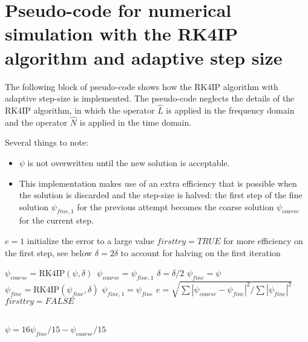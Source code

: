 \section{Pseudo-code for numerical simulation with the RK4IP algorithm and adaptive step size}


The following block of pseudo-code shows how the RK4IP algorithm with adaptive step-size is implemented. The pseudo-code neglects the details of the RK4IP algorithm, in which the operator $\hat{L}$ is applied in the frequency domain and the operator $\hat{N}$ is applied in the time domain. 

Several things to note:
\begin{itemize}
	\item $\psi$ is not overwritten until the new solution is acceptable. 
	\item This implementation makes use of an extra efficiency that is possible when the solution is discarded and the step-size is halved: the first step of the fine solution $\psi_{fine,1}$ for the previous attempt becomes the coarse solution $\psi_{coarse}$ for the current step.
\end{itemize}


	\begin{algorithmic}
		

		
		
		
		
		\State $e=1$ initialize the error to a large value
		\State $firsttry=TRUE$ for more efficiency on the first step, see below
		\State $\delta=2\delta$ to account for halving on the first iteration
		
		 \State $\psi_{coarse}=\mathrm{RK4IP}(\psi,\delta)$
		\Else \State $\,\psi_{coarse}=\psi_{fine,1}$
		\EndIf
		\State$\delta=\delta/2$
		\State$\psi_{fine}=\psi$
		\State $\psi_{fine}=\mathrm{RK4IP}(\psi_{fine},\delta)$
		\State $\psi_{fine,1}=\psi_{fine}$
		\EndIf
		\EndFor
		\State $e=\sqrt{\sum{|\psi_{coarse}-\psi_{fine}|^2}/\sum{|\psi_{fine}|^2}}$
		\State $firsttry=FALSE$
		\EndWhile
		
		\EndWhile\\
		\State $\psi=16\psi_{fine}/15-\psi_{coarse}/15$
		 
		\EndIf
		 
		\EndIf
	\EndProcedure
	\end{algorithmic}

